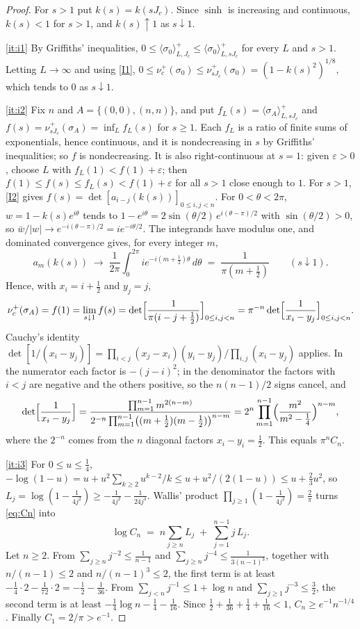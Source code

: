 \documentclass[11pt]{article}
\theoremstyle{plain}
\theoremstyle{definition}
\theoremstyle{remark}
\newcommand{\eps}{\varepsilon}
\begin{document}
\begin{proof}
For $s>1$ put $k(s)=k(sJ_c)$. Since $\sinh$ is increasing and continuous, $k(s)<1$ for $s>1$, and $k(s)\uparrow1$ as $s\downarrow1$.

\ref{it:i1} By Griffiths' inequalities, $0\le\langle\sigma_0\rangle^+_{L,J_c}\le\langle\sigma_0\rangle^+_{L,sJ_c}$ for every $L$ and $s>1$. Letting $L\to\infty$ and using \ref{I1}, $0\le\nu^+_c(\sigma_0)\le\nu^+_{sJ_c}(\sigma_0)=(1-k(s)^2)^{1/8}$, which tends to $0$ as $s\downarrow1$.

\ref{it:i2} Fix $n$ and $A=\{(0,0),(n,n)\}$, and put $f_L(s)=\langle\sigma_A\rangle^+_{L,sJ_c}$ and $f(s)=\nu^+_{sJ_c}(\sigma_A)=\inf_Lf_L(s)$ for $s\ge1$. Each $f_L$ is a ratio of finite sums of exponentials, hence continuous, and it is nondecreasing in $s$ by Griffiths' inequalities; so $f$ is nondecreasing. It is also right-continuous at $s=1$: given $\eps>0$, choose $L$ with $f_L(1)<f(1)+\eps$; then $f(1)\le f(s)\le f_L(s)<f(1)+\eps$ for all $s>1$ close enough to $1$. For $s>1$, \ref{I2} gives $f(s)=\det[a_{i-j}(k(s))]_{0\le i,j<n}$. For $0<\theta<2\pi$, $w=1-k(s)e^{i\theta}$ tends to $1-e^{i\theta}=2\sin(\theta/2)\,e^{i(\theta-\pi)/2}$ with $\sin(\theta/2)>0$, so $\bar w/|w|\to e^{-i(\theta-\pi)/2}=ie^{-i\theta/2}$. The integrands have modulus one, and dominated convergence gives, for every integer $m$,
\[
a_m(k(s))\;\longrightarrow\;\frac1{2\pi}\int_0^{2\pi}ie^{-i(m+\frac12)\theta}\,d\theta\;=\;\frac{1}{\pi(m+\frac12)}\qquad(s\downarrow1).
\]
Hence, with $x_i=i+\frac12$ and $y_j=j$,
\[
\nu^+_c(\sigma_A)=f(1)=\lim_{s\downarrow1}f(s)=\det\Bigl[\frac1{\pi(i-j+\frac12)}\Bigr]_{0\le i,j<n}=\pi^{-n}\det\Bigl[\frac1{x_i-y_j}\Bigr]_{0\le i,j<n}.
\]
Cauchy's identity $\det[1/(x_i-y_j)]=\prod_{i<j}(x_j-x_i)(y_i-y_j)/\prod_{i,j}(x_i-y_j)$ applies. In the numerator each factor is $-(j-i)^2$; in the denominator the factors with $i<j$ are negative and the others positive, so the $n(n-1)/2$ signs cancel, and
\[
\det\Bigl[\frac1{x_i-y_j}\Bigr]=\frac{\prod_{m=1}^{n-1}m^{2(n-m)}}{2^{-n}\prod_{m=1}^{n-1}\bigl((m+\frac12)(m-\frac12)\bigr)^{n-m}}=2^n\prod_{m=1}^{n-1}\Bigl(\frac{m^2}{m^2-\frac14}\Bigr)^{n-m},
\]
where the $2^{-n}$ comes from the $n$ diagonal factors $x_i-y_i=\frac12$. This equals $\pi^nC_n$.

\ref{it:i3} For $0\le u\le\frac14$, $-\log(1-u)=u+u^2\sum_{k\ge2}u^{k-2}/k\le u+u^2/(2(1-u))\le u+\frac23u^2$, so $L_j=\log(1-\frac1{4j^2})\ge-\frac1{4j^2}-\frac1{24j^4}$. Wallis' product $\prod_{j\ge1}(1-\frac1{4j^2})=\frac2\pi$ turns \eqref{eq:Cn} into
\[
\log C_n\;=\;n\sum_{j\ge n}L_j\;+\;\sum_{j=1}^{n-1}j\,L_j.
\]
Let $n\ge2$. From $\sum_{j\ge n}j^{-2}\le\frac1{n-1}$ and $\sum_{j\ge n}j^{-4}\le\frac1{3(n-1)^3}$, together with $n/(n-1)\le2$ and $n/(n-1)^3\le2$, the first term is at least $-\frac14\cdot2-\frac1{72}\cdot2=-\frac12-\frac1{36}$. From $\sum_{j<n}j^{-1}\le1+\log n$ and $\sum_{j\ge1}j^{-3}\le\frac32$, the second term is at least $-\frac14\log n-\frac14-\frac1{16}$. Since $\frac12+\frac1{36}+\frac14+\frac1{16}<1$, $C_n\ge e^{-1}n^{-1/4}$. Finally $C_1=2/\pi>e^{-1}$.
\end{proof}
\end{document}
